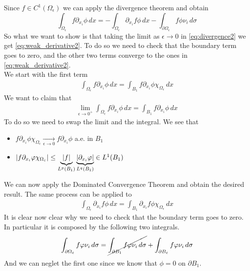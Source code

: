 Since \(f \in C^1(\Omega_\epsilon)\) we can apply the divergence theorem and obtain
\begin{equation}\label{eq:divergence2}
\int_{\Omega_\epsilon} f \partial_{x_i} \phi \, dx = -\int_{\Omega_\epsilon} \partial_{x_i} f \phi \, dx - \int_{\partial\Omega_\epsilon} f \phi \nu_i \, d\sigma
\end{equation}
So what we want to show is that taking the limit as \(\epsilon \to 0\) in \eqref{eq:divergence2} we get \eqref{eq:weak_derivative2}. 
To do so we need to check that the boundary term goes to zero, and the other two terms converge to the ones in \eqref{eq:weak_derivative2}. \\
We start with the first term
\[ 
    \begin{split}
        \int_{\Omega_\epsilon} f \partial_{x_i} \phi \, dx = \int_{B_1} f \partial_{x_i} \phi \chi_{\Omega_\epsilon} \, dx
    \end{split}
\]
We want to claim that 
\[
    \begin{split}
        \lim_{\epsilon \to 0^+} \int_{\Omega_\epsilon} f \partial_{x_i} \phi \, dx = \int_{B_1} f \partial_{x_i} \phi \, dx
    \end{split}
\]
To do so we need to swap the limit and the integral. We see that 
\begin{itemize}
    \item \(f \partial_{x_i} \phi \chi_{\Omega_\epsilon} \underset{\epsilon \to 0}{\longrightarrow} f \partial_{x_i} \phi\) a.e. in \(B_1\)
    \item \(\abs{f \partial_{x_i} \phi \chi_{\Omega_\epsilon}} \leq \underbrace{\abs{f}}_{L^p(B_1)} \underbrace{\abs{\partial_{x_i} \phi}}_{L^q(B_1)} \in L^1(B_1)\)
\end{itemize}
We can now apply the Dominated Convergence Theorem and obtain the desired result. 
The same process can be applied to
\[
    \begin{split}
        \int_{\Omega_\epsilon} \partial_{x_i} f \phi \, dx = \int_{B_1} \partial_{x_i} f \phi \chi_{\Omega_\epsilon} \, dx
    \end{split}
\]
It is clear now clear why we need to check that the boundary term goes to zero. In particular it is composed by the following two integrals.
\[
    \begin{split}
        \int_{\partial\Omega_\epsilon} f \phi \nu_i \, d\sigma = \cancel{\int_{\partial B_1} f \phi \nu_i \, d\sigma} + \int_{\partial B_\epsilon} f \phi \nu_i \, d\sigma
    \end{split}
\]
And we can neglet the first one since we know that $\phi = 0$ on $\partial B_1$.
